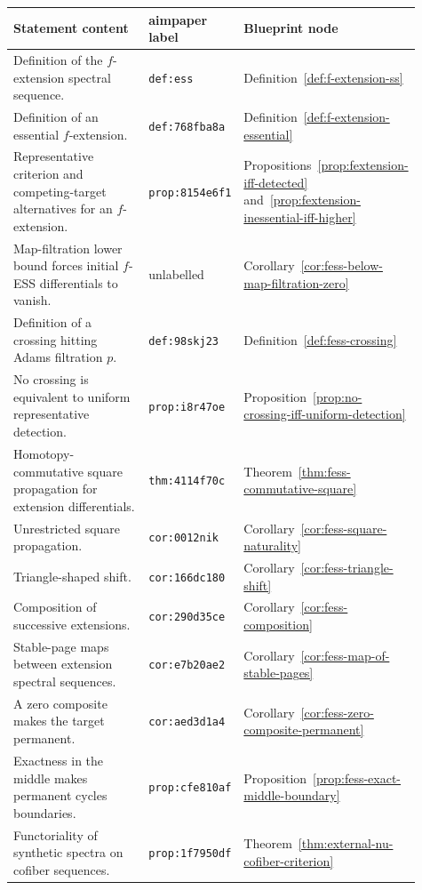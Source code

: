 \begin{center}
\scriptsize
\begin{tabular}{p{0.49\linewidth}p{0.17\linewidth}p{0.25\linewidth}}
\textbf{Statement content} & \textbf{aimpaper label} & \textbf{Blueprint node} \\
\hline
Definition of the $f$-extension spectral sequence. & \texttt{def:ess} & Definition~\ref{def:f-extension-ss} \\
Definition of an essential $f$-extension. & \texttt{def:768fba8a} & Definition~\ref{def:f-extension-essential} \\
Representative criterion and competing-target alternatives for an $f$-extension. & \texttt{prop:8154e6f1} & Propositions~\ref{prop:fextension-iff-detected} and~\ref{prop:fextension-inessential-iff-higher} \\
Map-filtration lower bound forces initial $f$-ESS differentials to vanish. & unlabelled & Corollary~\ref{cor:fess-below-map-filtration-zero} \\
Definition of a crossing hitting Adams filtration $p$. & \texttt{def:98skj23} & Definition~\ref{def:fess-crossing} \\
No crossing is equivalent to uniform representative detection. & \texttt{prop:i8r47oe} & Proposition~\ref{prop:no-crossing-iff-uniform-detection} \\
Homotopy-commutative square propagation for extension differentials. & \texttt{thm:4114f70c} & Theorem~\ref{thm:fess-commutative-square} \\
Unrestricted square propagation. & \texttt{cor:0012nik} & Corollary~\ref{cor:fess-square-naturality} \\
Triangle-shaped shift. & \texttt{cor:166dc180} & Corollary~\ref{cor:fess-triangle-shift} \\
Composition of successive extensions. & \texttt{cor:290d35ce} & Corollary~\ref{cor:fess-composition} \\
Stable-page maps between extension spectral sequences. & \texttt{cor:e7b20ae2} & Corollary~\ref{cor:fess-map-of-stable-pages} \\
A zero composite makes the target permanent. & \texttt{cor:aed3d1a4} & Corollary~\ref{cor:fess-zero-composite-permanent} \\
Exactness in the middle makes permanent cycles boundaries. & \texttt{prop:cfe810af} & Proposition~\ref{prop:fess-exact-middle-boundary} \\
Functoriality of synthetic spectra on cofiber sequences. & \texttt{prop:1f7950df} & Theorem~\ref{thm:external-nu-cofiber-criterion} \\

\end{tabular}
\end{center}
